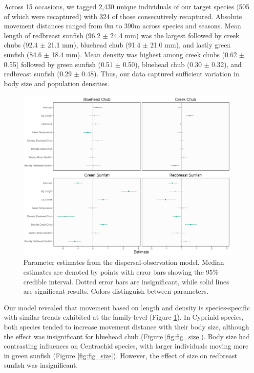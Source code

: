 \documentclass[11pt, class=article, crop=false]{standalone}
\begin{document}
Across 15 occasions, we tagged 2,430 unique individuals of our target species (505 of which were recaptured) with 324 of those consecutively recaptured. Absolute movement distances ranged from 0m to 390m across species and seasons. Mean length of redbreast sunfish (96.2 $\pm$ 24.4 mm) was the largest followed by creek chubs (92.4 $\pm$ 21.1 mm), bluehead chub (91.4 $\pm$ 21.0 mm), and lastly green sunfish (84.6 $\pm$ 18.4 mm). Mean density was highest among creek chubs (0.62 $\pm$ 0.55) followed by green sunfish (0.51 $\pm$ 0.50), bluehead chub (0.30 $\pm$ 0.32), and redbreast sunfish (0.29 $\pm$ 0.48). Thus, our data captured sufficient variation in body size and population densities. 
\begin{figure}
    \centering
    \includegraphics[width=0.75\linewidth]{output/fig_est.pdf}
    \caption{ Parameter estimates from the dispersal-observation model. Median estimates are denoted by points with error bars showing the 95\% credible interval. Dotted error bars are insignificant, while solid lines are significant results. Colors distinguish between parameters. }
    \label{fig:fig_est}
\end{figure}
Our model revealed that movement based on length and density is species-specific with similar trends exhibited at the family-level (Figure \ref{fig:fig_est}). In Cyprinid species, both species tended to increase movement distance with their body size, although the effect was insignificant for bluehead chub (Figure \ref{fig:fig_size}). Body size had contrasting influences on Centrachid species, with larger individuals moving more in green sunfish (Figure \ref{fig:fig_size}). However, the effect of size on redbreast sunfish was insignificant.
\end{document}
